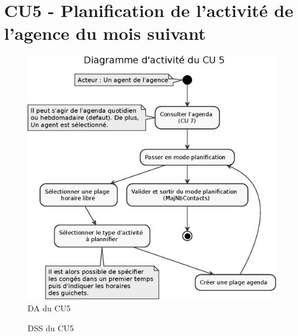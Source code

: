 \section{CU5 - Planification de l’activité de l’agence du mois suivant}
\vspace{2cm}
\begin{figure}[H]
\centering
\includegraphics[width=\textwidth]{figures/eps/DA_CU5.eps}
\caption{DA du CU5}
\end{figure}

\begin{figure}[H]
\noindent{}
\caption{DSS du CU5}
\end{figure}


